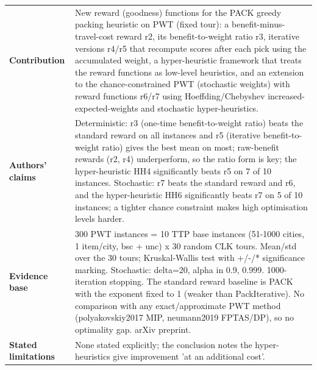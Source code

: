\documentclass[
  a4paper,
  11pt,
  headings=small,
  numbers=noenddot,
  abstract=on,
  parskip=half,
]{scrartcl}
\begin{document}
\begin{landscape}
\begin{longtable}{@{}p{2.6cm}p{8.7cm}p{2.6cm}p{8.7cm}@{}}
\textbf{Contribution} & \multicolumn{3}{p{20.0cm}}{New reward (goodness) functions for the PACK greedy packing heuristic on PWT (fixed tour): a benefit-minus-travel-cost reward r2, its benefit-to-weight ratio r3, iterative versions r4/r5 that recompute scores after each pick using the accumulated weight, a hyper-heuristic framework that treats the reward functions as low-level heuristics, and an extension to the chance-constrained PWT (stochastic weights) with reward functions r6/r7 using Hoeffding/Chebyshev increased-expected-weights and stochastic hyper-heuristics.} \\
\textbf{Authors' claims} & \multicolumn{3}{p{20.0cm}}{Deterministic: r3 (one-time benefit-to-weight ratio) beats the standard reward on all instances and r5 (iterative benefit-to-weight ratio) gives the best mean on most; raw-benefit rewards (r2, r4) underperform, so the ratio form is key; the hyper-heuristic HH4 significantly beats r5 on 7 of 10 instances. Stochastic: r7 beats the standard reward and r6, and the hyper-heuristic HH6 significantly beats r7 on 5 of 10 instances; a tighter chance constraint makes high optimisation levels harder.} \\
\textbf{Evidence base} & \multicolumn{3}{p{20.0cm}}{300 PWT instances = 10 TTP base instances (51-1000 cities, 1 item/city, bsc + unc) x 30 random CLK tours. Mean/std over the 30 tours; Kruskal-Wallis test with +/-/* significance marking. Stochastic: delta=20, alpha in {0.9, 0.999}. 1000-iteration stopping. The standard reward baseline is PACK with the exponent fixed to 1 (weaker than PackIterative). No comparison with any exact/approximate PWT method (polyakovskiy2017 MIP, neumann2019 FPTAS/DP), so no optimality gap. arXiv preprint.} \\
\textbf{Stated limitations} & \multicolumn{3}{p{20.0cm}}{None stated explicitly; the conclusion notes the hyper-heuristics give improvement 'at an additional cost'.} \\

\end{longtable}
\end{landscape}
\end{document}
